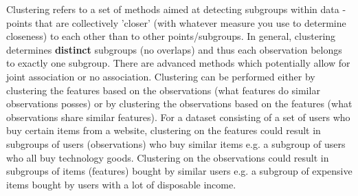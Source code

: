 Clustering refers to a set of methods aimed at detecting subgroups within data - points that are collectively 'closer' (with whatever measure you use to determine closeness) to each other than to other points/subgroups. In general, clustering determines \textbf{distinct} subgroups (no overlaps) and thus each observation belongs to exactly one subgroup. There are advanced methods which potentially allow for joint association or no association. Clustering can be performed either by clustering the features based on the observations (what features do similar observations posses) or by clustering the observations based on the features (what observations share similar features). For a dataset consisting of a set of users who buy certain items from a website, clustering on the features could result in subgroups of users (observations) who buy similar items e.g. a subgroup of users who all buy technology goods. Clustering on the observations could result in subgroups of items (features) bought by similar users e.g. a subgroup of expensive items bought by users with a lot of disposable income.
